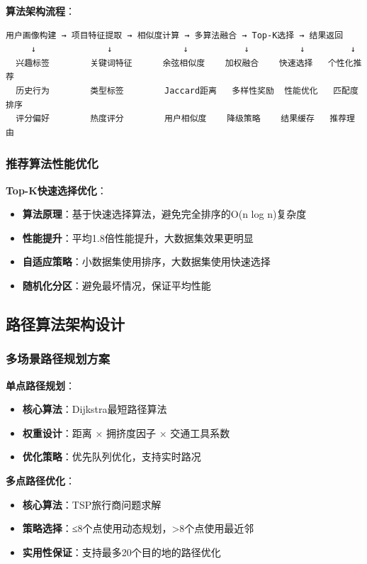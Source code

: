 \documentclass[12pt,a4paper]{article}
\begin{document}
\textbf{算法架构流程}：
\begin{verbatim}
用户画像构建 → 项目特征提取 → 相似度计算 → 多算法融合 → Top-K选择 → 结果返回
     ↓              ↓              ↓           ↓          ↓         ↓
  兴趣标签        关键词特征      余弦相似度    加权融合    快速选择   个性化推荐
  历史行为        类型标签        Jaccard距离   多样性奖励  性能优化   匹配度排序
  评分偏好        热度评分        用户相似度    降级策略    结果缓存   推荐理由
\end{verbatim}

\subsubsection{推荐算法性能优化}

\textbf{Top-K快速选择优化}：
\begin{itemize}
    \item \textbf{算法原理}：基于快速选择算法，避免完全排序的O(n log n)复杂度
    \item \textbf{性能提升}：平均1.8倍性能提升，大数据集效果更明显
    \item \textbf{自适应策略}：小数据集使用排序，大数据集使用快速选择
    \item \textbf{随机化分区}：避免最坏情况，保证平均性能
\end{itemize}

\subsection{路径算法架构设计}

\subsubsection{多场景路径规划方案}

\begin{solutionbox}[title={双模式路径规划架构}]
\textbf{单点路径规划}：
\begin{itemize}[nosep]
    \item \textbf{核心算法}：Dijkstra最短路径算法
    \item \textbf{权重设计}：距离 × 拥挤度因子 × 交通工具系数
    \item \textbf{优化策略}：优先队列优化，支持实时路况
\end{itemize}

\textbf{多点路径优化}：
\begin{itemize}[nosep]
    \item \textbf{核心算法}：TSP旅行商问题求解
    \item \textbf{策略选择}：≤8个点使用动态规划，>8个点使用最近邻
    \item \textbf{实用性保证}：支持最多20个目的地的路径优化
\end{itemize}
\end{solutionbox}
\end{document}
